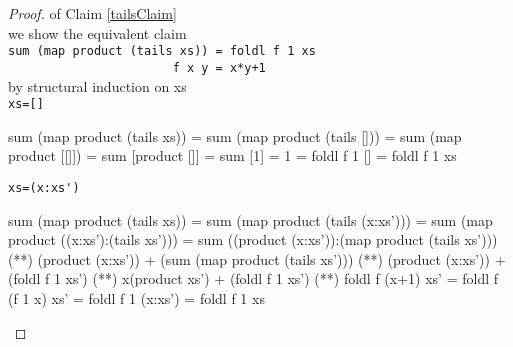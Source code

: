 \begin{proof} of Claim \ref{tailsClaim}\\
we show the equivalent claim\\
\verb|sum (map product (tails xs)) = foldl f 1 xs|\\
\verb|                       f x y = x*y+1|\\
by structural induction on xs\\
\verb|xs=[]|
\begin{code}
sum (map product (tails xs)) 
              = sum (map product (tails []))
              = sum (map product [[]])
              = sum [product []]
              = sum [1]
              = 1
              = foldl f 1 []
              = foldl f 1 xs
\end{code}
\verb|xs=(x:xs')|
\begin{code}
sum (map product (tails xs)) 
              = sum (map product (tails (x:xs')))
              = sum (map product ((x:xs'):(tails xs')))
              = sum ((product (x:xs')):(map product (tails xs')))
              (*\sEq{\ref{sumLemma}}*) (product (x:xs')) + (sum (map product (tails xs')))
              (**) (product (x:xs')) + (foldl f 1 xs')
              (*\sEq{\ref{prodLemma}}*) x(product xs') + (foldl f 1 xs')
              (*\sEq{\ref{prodfoldlLemma}}*) foldl f (x+1) xs'
              = foldl f (f 1 x) xs'
              = foldl f 1 (x:xs')
              = foldl f 1 xs
\end{code}
\end{proof}